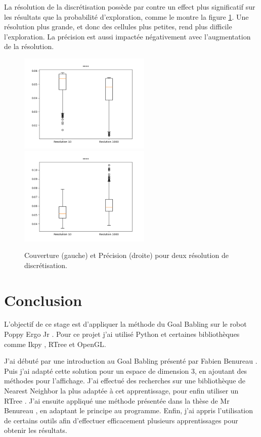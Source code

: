 \documentclass[11pt,french]{report}
\begin{document}
La résolution de la discrétisation possède par contre un effect plus significatif sur les résultats que la probabilité d'exploration, comme le montre la figure \ref{fig:effet_res}.
Une résolution plus grande, et donc des cellules plus petites, rend plus difficile l'exploration.
La précision est aussi impactée négativement avec l'augmentation de la résolution.

\begin{figure}[h]
    \centering
    \includegraphics[width=178pt]{Fro_10-1kres_couver.png} \includegraphics[width=178pt]{Fro_10-1kres_moy_gl.png}
    \caption{Couverture (gauche) et Précision (droite) pour deux résolution de discrétisation.}
    \label{fig:effet_res}
\end{figure}

\chapter{Conclusion}

L'objectif de ce stage est d'appliquer la méthode du Goal Babling \cite{GoalBabling} sur le robot Poppy Ergo Jr \cite{PoppyErgoJr}.
Pour ce projet j'ai utilisé Python et certaines bibliothèques comme Ikpy \cite{IKPy}, RTree \cite{RTree} et OpenGL.

J'ai débuté par une introduction au Goal Babling présenté par Fabien Benureau \cite{TutoGoalBabling}.
Puis j'ai adapté cette solution pour un espace de dimension 3, en ajoutant des méthodes pour l'affichage.
J'ai effectué des recherches sur une bibliothèque de Nearest Neighbor la plus adaptée à cet apprentissage, pour enfin utiliser un RTree \cite{RTree}.
J'ai ensuite appliqué une méthode présentée dans la thèse de Mr Benureau \cite{TheseBenureau}, en adaptant le principe au programme.
Enfin, j'ai appris l'utilisation de certains outils afin d'effectuer efficacement plusieurs apprentissages pour obtenir les résultats.
\end{document}
